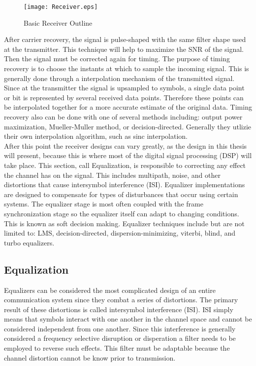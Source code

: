 \begin{figure}[!ht]\label{Receiver_Blocks}
\centering
\texttt{[image: Receiver.eps]}
\caption{Basic Receiver Outline}
\end{figure}

After carrier recovery, the signal is pulse-shaped with the same filter shape used at the transmitter.  This technique will help to maximize the SNR of the signal.  Then the signal must be corrected again for timing.  The purpose of timing recovery is to choose the instants at which to sample the incoming signal.  This is generally done through a interpolation mechanism of the transmitted signal.  Since at the transmitter the signal is upsampled to symbols, a single data point or bit is represented by several received data points.  Therefore these points can be interpolated together for a more accurate estimate of the original data.  Timing recovery also can be done with one of several methods including: output power maximization, Mueller-Muller method, or decision-directed.  Generally they utlizie their own interpolation algorithm, such as sinc interpolation.\\

After this point the receiver designs can vary greatly, as the design in this thesis will present, because this is where most of the digital signal processing (DSP) will take place.  This section, call Equalization, is responsible to correcting any effect the channel has on the signal. This includes multipath, noise, 	and other distortions that cause intersymbol interference (ISI).  Equalizer implementations are designed to compensate for types of disturbances that occur using certain systems.  The equalizer stage is most often coupled with the frame synchronization stage so the equalizer itself can adapt to changing conditions.  This is known as soft decision making.  Equalizer techniques include but are not limited to: LMS, decision-directed, dispersion-minimizing, viterbi, blind, and turbo equalizers.\\  

\subsection{Equalization}

Equalizers can be considered the most complicated design of an entire communication system since they combat a series of distortions.  The primary result of these distortions is called intersymbol interference (ISI).  ISI simply means that symbols interact with one another in the channel space and cannot be considered independent from one another.  Since this interference is generally considered a frequency selective disruption or disperation a filter needs to be employed to reverse such effects.  This filter must be adaptable because the channel distortion cannot be know prior to transmission.\\  

